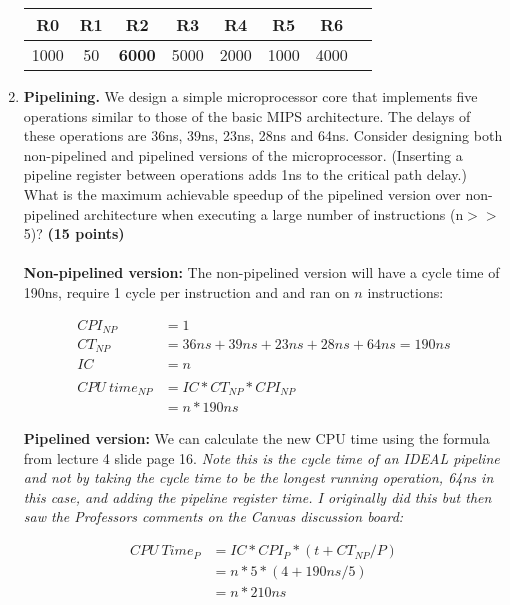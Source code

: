 \documentclass[a4paper, 15pt]{exam}
\begin{document}
\begin{enumerate}
  \begin{center}
 	\begin{tabular}{ |c|c|c|c|c|c|c|c|} 
 		\hline
 		R0 & R1 & R2& R3 & R4 &R5&R6\\ 
 		\hline
 		1000 & 50 & \textbf{6000} & 5000 & 2000 & 1000 & 4000\\ 
 		\hline
 	\end{tabular}
 \end{center}



\item \textbf{Pipelining.} We design a simple microprocessor core that implements five operations similar to those of the basic MIPS architecture. The delays of these operations are 36ns, 39ns, 23ns, 28ns and 64ns. Consider designing both non-pipelined and pipelined versions of the microprocessor. (Inserting a pipeline register between operations adds 1ns to the critical path delay.) What is the maximum achievable speedup of the pipelined version over non-pipelined architecture when executing a large number of instructions (n$>>$5)? \textbf{(15 points)} \\ \\
\textbf{Non-pipelined version:} The non-pipelined version will have a cycle time of 190ns, require 1 cycle per instruction and and ran on $n$ instructions:

\begin{align*}
	CPI_{NP} &= 1 \\
	CT_{NP} &= 36ns + 39ns + 23ns + 28ns + 64ns = 190ns \\
	IC &= n \\ \\
	CPU \ time_{NP} &= IC * CT_{NP} * CPI_{NP} \\
	&= n * 190ns 
\end{align*}

\textbf{Pipelined version:} We can calculate the new CPU time using the formula from lecture 4 slide page 16. \textit{Note this is the cycle time of an IDEAL pipeline and not by taking the cycle time to be the longest running operation, 64ns in this case, and adding the pipeline register time. I originally did this but then saw the Professors comments on the Canvas discussion board:}

\begin{align*}
	CPU \ Time_{P} &= IC * CPI_{P} * (t + CT_{NP}/P) \\
	&= n * 5 * (4 + 190ns/5) \\
	&= n * 210ns
\end{align*}


\end{enumerate}
\end{document}

